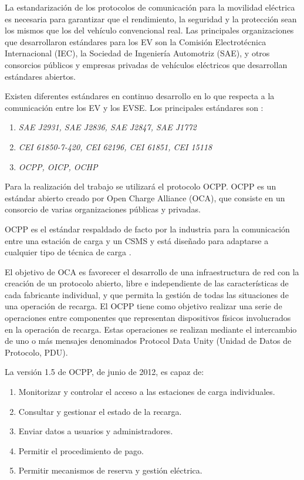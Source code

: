 \documentclass[12pt,a4paper,onecolumn,oneside]{report}
\begin{document}
La estandarización de los protocolos de comunicación para la movilidad eléctrica es necesaria para garantizar que el rendimiento, la seguridad y la protección sean los mismos que los del vehículo convencional real. Las principales organizaciones que desarrollaron estándares para los EV son la Comisión Electrotécnica Internacional (IEC), la Sociedad de Ingeniería Automotriz (SAE), y otros consorcios públicos y empresas privadas de vehículos eléctricos que desarrollan estándares abiertos.

Existen diferentes estándares en continuo desarrollo en lo que respecta a la comunicación entre los EV y los EVSE. Los principales estándares son \cite{quinceuno}\cite{quincedos}:

\begin{enumerate}

\item \textit{SAE J2931, SAE J2836, SAE J2847, SAE J1772}
\item \textit{CEI 61850-7-420, CEI 62196, CEI 61851, CEI 15118}
\item \textit{OCPP, OICP, OCHP}

\end{enumerate}

Para la realización del trabajo se utilizará el protocolo OCPP. OCPP \cite{quincedos}\cite{quincetres} es un estándar abierto creado por Open Charge Alliance (OCA), que consiste en un consorcio de varias organizaciones públicas y privadas.

OCPP es el estándar respaldado de facto por la industria para la comunicación entre una estación de carga y un CSMS y está diseñado para adaptarse a cualquier tipo de técnica de carga \cite{quincetres}.

El objetivo de OCA es favorecer el desarrollo de una infraestructura de red con la creación de un protocolo abierto, libre e independiente de las características de cada fabricante individual, y que permita la gestión de todas las situaciones de una operación de recarga. El OCPP tiene como objetivo realizar una serie de operaciones entre componentes que representan dispositivos físicos involucrados en la operación de recarga. Estas operaciones se realizan mediante el intercambio de uno o más mensajes denominados Protocol Data Unity (Unidad de Datos de Protocolo, PDU).

La versión 1.5 de OCPP, de junio de 2012, es capaz de:

\begin{enumerate}

\item Monitorizar y controlar el acceso a las estaciones de carga individuales.
\item Consultar y gestionar el estado de la recarga.
\item Enviar datos a usuarios y administradores.
\item Permitir el procedimiento de pago.
\item Permitir mecanismos de reserva y gestión eléctrica.

\end{enumerate}
\end{document}
